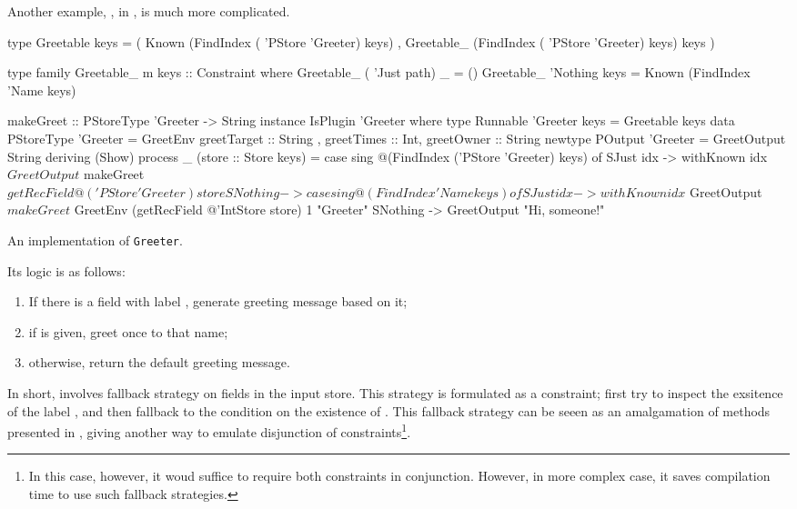 \documentclass[demotion-paper.tex]{subfiles}
\begin{document}
Another example, , in , is much more complicated.
\begin{listing}[tbp]
\begin{code}
type Greetable keys =
  ( Known (FindIndex ( 'PStore 'Greeter) keys)
  , Greetable_ 
    (FindIndex ( 'PStore 'Greeter) keys) keys
  )

type family Greetable_ m keys :: Constraint where
  Greetable_ ( 'Just path) _ = ()
  Greetable_ 'Nothing keys = 
    Known (FindIndex 'Name keys)

makeGreet :: PStoreType 'Greeter -> String
instance IsPlugin 'Greeter where
  type Runnable 'Greeter keys = Greetable keys
  data PStoreType 'Greeter = GreetEnv
    { greetTarget :: String
    , greetTimes :: Int, greetOwner :: String }
  newtype POutput 'Greeter = 
    GreetOutput String deriving (Show)
  process _ (store :: Store keys) =
    case sing
        @(FindIndex ('PStore 'Greeter) keys) of
     SJust idx -> withKnown idx $ GreetOutput $
       makeGreet $ getRecField 
         @('PStore 'Greeter) store
     SNothing ->
      case sing @(FindIndex 'Name keys) of
       SJust idx -> withKnown idx $ GreetOutput $
         makeGreet $ GreetEnv
          (getRecField @'IntStore store)
          1 "Greeter"
       SNothing -> GreetOutput "Hi, someone!"
\end{code}
\caption{An implementation of \texttt{Greeter}.}
\label{lst:plugin-greet}
\end{listing}
Its logic is as follows:
\begin{enumerate}
  \item If there is a field with label , generate greeting message based on it;
  \item if  is given, greet once to that name;
  \item otherwise, return the default greeting message.
\end{enumerate}
In short,  involves fallback strategy on fields in the input store.
This strategy is formulated as a  constraint; first try to inspect the exsitence of the label , and then fallback to the condition on the existence of .
This fallback strategy can be seeen as an amalgamation of methods presented in , giving another way to emulate disjunction of constraints\footnote{%
In this case, however, it woud suffice to require both  constraints in conjunction. However, in more complex case, it saves compilation time to use such fallback strategies.}.
\end{document}

